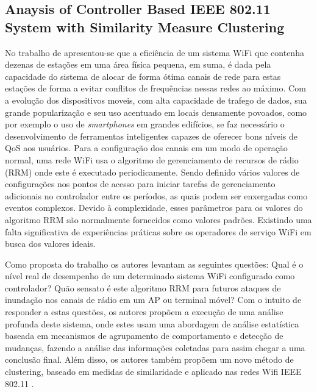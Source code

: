 \documentclass[ti,table]{texufpel} %
\begin{document}
     

  

  

\subsection{Anaysis of Controller Based IEEE 802.11 System with Similarity Measure Clustering} 

  

  

    No trabalho de \cite{art7gal2017anaysis} apresentou-se que a eficiência de um sistema WiFi que contenha dezenas de estações em uma área física pequena, em suma, é dada pela capacidade do sistema de alocar de forma ótima canais de rede para estas estações de forma a evitar conflitos de frequências nessas redes ao máximo. Com a evolução dos dispositivos moveis, com alta capacidade de trafego de dados, sua grande popularização e seu uso acentuado em locais densamente povoados, como por exemplo o uso de \textit{smartphones} em grandes edifícios, se faz necessário o desenvolvimento de ferramentas inteligentes capazes de oferecer bons níveis de QoS aos usuários. Para a configuração dos canais em um modo de operação normal, uma rede WiFi usa o algoritmo de gerenciamento de recursos de rádio (RRM) onde este é executado periodicamente. Sendo definido vários valores de configurações nos pontos de acesso para iniciar tarefas de gerenciamento adicionais no controlador entre os períodos, as quais podem ser enxergadas como eventos complexos. Devido à complexidade, esses parâmetros para os valores do algoritmo RRM são normalmente fornecidos como valores padrões. Existindo uma falta significativa de experiências práticas sobre os operadores de serviço WiFi em busca dos valores ideais. 

     

     Como proposta do trabalho os autores levantam as seguintes questões: Qual é o nível real de desempenho de um determinado sistema WiFi configurado como controlador? Quão sensato é este algoritmo RRM para futuros ataques de inundação nos canais de rádio em um AP ou terminal móvel? Com o intuito de responder a estas questões, os autores propõem a execução de uma análise profunda deste sistema, onde estes usam uma abordagem de análise estatística baseada em mecanismos de agrupamento de comportamento e detecção de mudanças, fazendo a análise das informações coletadas para assim chegar a uma conclusão final. Além disso, os autores também propõem um novo método de clustering, baseado em medidas de similaridade e aplicado nas redes Wifi IEEE 802.11 \cite{art7gal2017anaysis}.         
\end{document}
